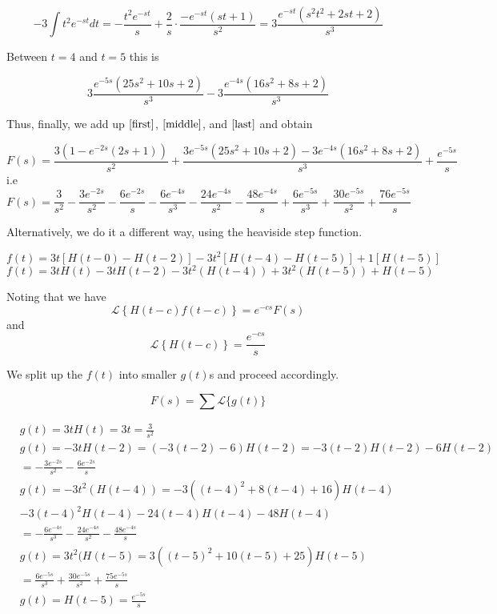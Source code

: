 \documentclass{article}
\begin{document}
$$-3 \int t^2 e^{-st} dt = -\frac{t^2e^{-st}}{s}+\frac{2}{s} \cdot \frac{-e^{-st}(st+1)}{s^2} = 3\frac{e^{-st}\left(s^2t^2+2st+2\right)}{s^3}$$

Between $t=4$ and $t=5$ this is

\begin{equation}\label{middle}
3\frac{e^{-5s}\left(25s^2+10s+2\right)}{s^3} - 3\frac{e^{-4s}\left(16s^2+8s+2\right)}{s^3}
\end{equation}

Thus, finally, we add up $\eqref{first}$, $\eqref{middle}$, and $\eqref{last}$ and obtain

$$
F(s) = \frac{3(1-e^{-2s}(2s+1))}{s^2} + \frac{3e^{-5s}\left(25s^2+10s+2\right) - 3e^{-4s}\left(16s^2+8s+2\right)}{s^3} + \frac{e^{-5s}}{s}
$$
i.e
$$F(s) = \frac{3}{s^2} -\frac{3e^{-2s}}{s^2} - \frac{6e^{-2s}}{s} -\frac{6e^{-4s}}{s^3}-\frac{24e^{-4s}}{s^2}-\frac{48e^{-4s}}{s} + \frac{6e^{-5s}}{s^3}+\frac{30e^{-5s}}{s^2}+\frac{76e^{-5s}}{s}$$


Alternatively, we do it a different way, using the heaviside step function.


$$f(t) = 3t \left[ H(t-0)-H(t-2)\right ] -3t^2 \left[ H(t-4) - H(t-5) \right] + 1 \left[ H(t-5) \right]$$
$$f(t) = 3tH(t) - 3tH(t-2) - 3t^2(H(t-4)) + 3t^2(H(t-5)) + H(t-5)$$

Noting that we have
$$ \mathcal{L} \left\{ H(t-c) f(t-c) \right\} = e^{-cs} F(s)$$
and
$$ \mathcal{L} \left\{H(t-c)\right\} = \frac{e^{-cs}}{s}$$

We split up the $f(t)$ into smaller $g(t)$s and proceed accordingly.

$$F(s) = \sum \mathcal{L}\{g(t)\}$$

\begin{align*}
&g(t) = 3tH(t) = 3t = \frac{3}{s^2} \\
&g(t) = -3tH(t-2) = (-3 (t-2)-6)H(t-2) =-3(t-2)H(t-2)-6H(t-2) \\
&= -\frac{3e^{-2s}}{s^2} - \frac{6e^{-2s}}{s} \\
& g(t) = -3t^2(H(t-4)) = -3((t-4)^2+8(t-4)+16)H(t-4) \\
& -3(t-4)^2H(t-4)-24(t-4)H(t-4)-48H(t-4) \\
&= -\frac{6e^{-4s}}{s^3}-\frac{24e^{-4s}}{s^2}-\frac{48e^{-4s}}{s} \\
&g(t) = 3t^2(H(t-5) =  3((t-5)^2+10(t-5)+25)H(t-5) \\
&= \frac{6e^{-5s}}{s^3}+\frac{30e^{-5s}}{s^2}+\frac{75e^{-5s}}{s} \\
&g(t) = H(t-5) = \frac{e^{-5s}}{s}
\end{align*}
\end{document}
